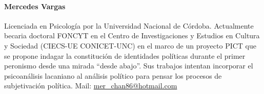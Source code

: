 \paragraph{Mercedes Vargas} Licenciada en Psicología por la Universidad Nacional de Córdoba.
Actualmente becaria doctoral FONCYT en el Centro de Investigaciones y
Estudios en Cultura y Sociedad (CIECS-UE CONICET-UNC) en el marco de un
proyecto PICT que se propone indagar la constitución de identidades
políticas durante el primer peronismo desde una mirada \enquote{desde abajo}.
Sus trabajos intentan incorporar el psicoanálisis lacaniano al análisis
político para pensar los procesos de subjetivación política. Mail: \url{mer\_chan86@hotmail.com}

\ifPDF
{}
\fi
